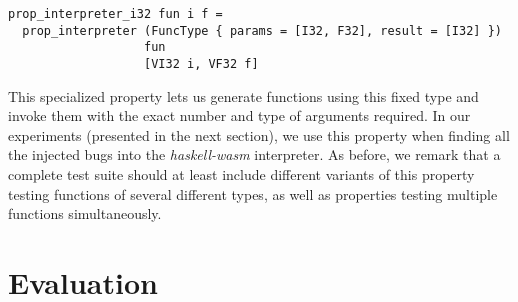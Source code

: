 \documentclass[sigconf, anonymous, review]{acmart}
\newcommand{\mutagen}{\textsc{Mutagen}\xspace}
\begin{document}
\begin{verbatim}
prop_interpreter_i32 fun i f =
  prop_interpreter (FuncType { params = [I32, F32], result = [I32] })
                   fun
                   [VI32 i, VF32 f]
\end{verbatim}

This specialized property lets us generate functions using this fixed type and
invoke them with the exact number and type of arguments required.
%
In our experiments (presented in the next section), we use this property when
finding all the injected bugs into the \textit{haskell-wasm} interpreter.
%
As before, we remark that a complete test suite should at least include
different variants of this property testing functions of several different
types, as well as properties testing multiple functions simultaneously.




\section{Evaluation}
\label{sec:evaluation}
\end{document}
